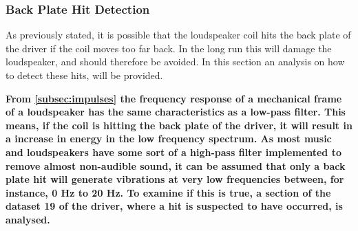 \subsubsection{Back Plate Hit Detection}\label{sec:hit_detect}
As previously stated, it is possible that the loudspeaker coil hits the back plate of the driver if the coil moves too far back. In the long run this will damage the loudspeaker, and should therefore be avoided. In this section an analysis on how to detect these hits, will be provided. 

\textbf{From \autoref{subsec:impulses} the frequency response of a mechanical frame of a loudspeaker has the same characteristics as a low-pass filter. This means, if the coil is hitting the back plate of the driver, it will result in a increase in energy in the low frequency spectrum. As most music and loudspeakers have some sort of a high-pass filter implemented to remove almost non-audible sound, it can be assumed that only a back plate hit will generate vibrations at very low frequencies between, for instance, 0 Hz to 20 Hz. To examine if this is true, a section of the dataset 19 of the driver, where a hit is suspected to have occurred, is analysed.} %


%	
%	


%

